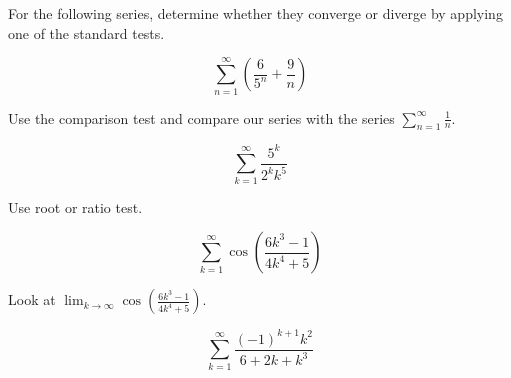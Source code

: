 \documentclass{ximera}
\author{Jason Miller}
\begin{document}
\begin{exercise}
For the following series, determine whether they converge or diverge by applying one of the standard tests. 


\begin{exercise}

\[
\sum^{\infty}_{n=1}
\left( \frac{6}{5^n} + \frac{9}{n} \right)
\]

\begin{multipleChoice}
\end{multipleChoice}

\begin{feedback}[correct]
Use the comparison test and compare our series with the series $\sum^{\infty}_{n=1} \frac{1}{n}$. 
\end{feedback}
\end{exercise}


\begin{exercise}

\[
\sum^{\infty}_{k=1} \frac{5^k}{2^k k^5}
\]



\begin{multipleChoice}
\end{multipleChoice}

\begin{feedback}[correct]
Use root or ratio test. 
\end{feedback}
\end{exercise}


\begin{exercise}


\[
\sum^{\infty}_{k=1}  \cos\left( \frac{ 6k^3-1}{4k^4 + 5} \right)
\]



\begin{multipleChoice}
\end{multipleChoice}

\begin{feedback}[correct]
Look at $\lim_{k \to \infty}  \cos\left( \frac{ 6k^3-1}{4k^4 + 5}\right)$. 
\end{feedback}
\end{exercise}




\begin{exercise}

\[
\sum^{\infty}_{k=1} \frac{(-1)^{k+1} k^2}{6+2k+k^3}
\]


\end{exercise}
\end{exercise}
\end{document}
